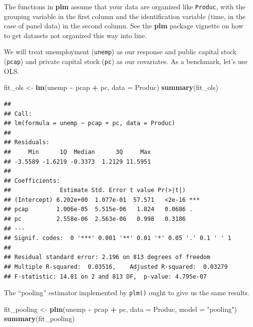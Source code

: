 \documentclass[
  12pt,
  oneside,openany]{book}
\newenvironment{Shaded}{\begin{snugshade}}{\end{snugshade}}
\newcommand{\DataTypeTok}[1]{\textcolor[rgb]{0.13,0.29,0.53}{#1}}
\newcommand{\KeywordTok}[1]{\textcolor[rgb]{0.13,0.29,0.53}{\textbf{#1}}}
\newcommand{\NormalTok}[1]{#1}
\newcommand{\OperatorTok}[1]{\textcolor[rgb]{0.81,0.36,0.00}{\textbf{#1}}}
\newcommand{\StringTok}[1]{\textcolor[rgb]{0.31,0.60,0.02}{#1}}
\begin{document}
The functions in \textbf{plm} assume that your data are organized like \texttt{Produc}, with the grouping variable in the first column and the identification variable (time, in the case of panel data) in the second column. See the \textbf{plm} package vignette on how to get datasets not organized this way into line.

We will treat unemployment (\texttt{unemp}) as our response and public capital stock (\texttt{pcap}) and private capital stock (\texttt{pc}) as our covariates. As a benchmark, let's use OLS.

\begin{Shaded}
\begin{Highlighting}[]
\NormalTok{fit\_ols \textless{}{-}}\StringTok{ }\KeywordTok{lm}\NormalTok{(unemp }\OperatorTok{\textasciitilde{}}\StringTok{ }\NormalTok{pcap }\OperatorTok{+}\StringTok{ }\NormalTok{pc,}
              \DataTypeTok{data =}\NormalTok{ Produc)}
\KeywordTok{summary}\NormalTok{(fit\_ols)}
\end{Highlighting}
\end{Shaded}

\begin{verbatim}
## 
## Call:
## lm(formula = unemp ~ pcap + pc, data = Produc)
## 
## Residuals:
##     Min      1Q  Median      3Q     Max 
## -3.5589 -1.6219 -0.3373  1.2129 11.5951 
## 
## Coefficients:
##              Estimate Std. Error t value Pr(>|t|)    
## (Intercept) 6.202e+00  1.077e-01  57.571   <2e-16 ***
## pcap        1.006e-05  5.515e-06   1.824   0.0686 .  
## pc          2.558e-06  2.563e-06   0.998   0.3186    
## ---
## Signif. codes:  0 '***' 0.001 '**' 0.01 '*' 0.05 '.' 0.1 ' ' 1
## 
## Residual standard error: 2.196 on 813 degrees of freedom
## Multiple R-squared:  0.03516,    Adjusted R-squared:  0.03279 
## F-statistic: 14.81 on 2 and 813 DF,  p-value: 4.795e-07
\end{verbatim}

The ``pooling'' estimator implemented by \texttt{plm()} ought to give us the same results.

\begin{Shaded}
\begin{Highlighting}[]
\NormalTok{fit\_pooling \textless{}{-}}\StringTok{ }\KeywordTok{plm}\NormalTok{(unemp }\OperatorTok{\textasciitilde{}}\StringTok{ }\NormalTok{pcap }\OperatorTok{+}\StringTok{ }\NormalTok{pc,}
                   \DataTypeTok{data =}\NormalTok{ Produc,}
                   \DataTypeTok{model =} \StringTok{"pooling"}\NormalTok{)}
\KeywordTok{summary}\NormalTok{(fit\_pooling)}
\end{Highlighting}
\end{Shaded}
\end{document}

